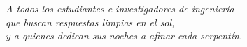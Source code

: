 \thispagestyle{empty}
\vspace*{7cm}
\begin{flushright}
\itshape
A todos los estudiantes e investigadores de ingeniería\\
que buscan respuestas limpias en el sol,\\
y a quienes dedican sus noches a afinar cada serpentín.
\end{flushright}
\newpage
